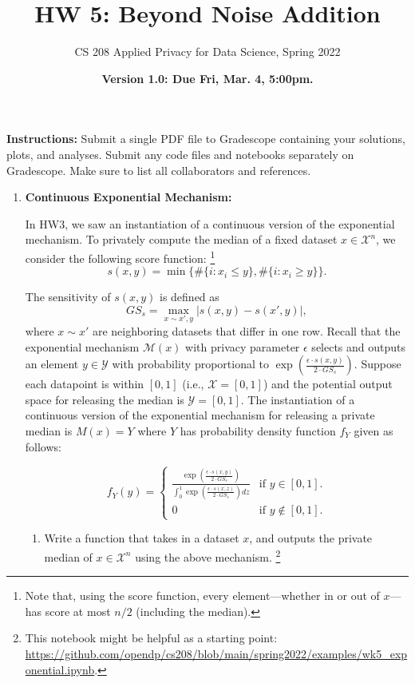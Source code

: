 \documentclass[11pt]{article}
\title{\vspace{-1.5cm} HW 5: Beyond Noise Addition
}
\author{CS 208 Applied Privacy for Data Science, Spring 2022}
\date{\textbf{Version 1.0: Due Fri, Mar. 4, 5:00pm.}}
\newcommand{\instructions}{\noindent \textbf{Instructions:} Submit a single PDF file to Gradescope containing your solutions, plots, and analyses. Submit any code files and notebooks separately on Gradescope. Make sure to list all collaborators and references.}
\newcommand{\calX}{\mathcal{X}}
\begin{document}
    \maketitle

    \instructions

    \begin{enumerate}[leftmargin=*]

        \item \textbf{Continuous Exponential Mechanism:}

        In HW3, we saw an instantiation of a continuous version
        of the exponential mechanism. To privately compute the median of a fixed dataset $x\in \mathcal{X}^n$, we consider the following score function:
        \footnote{Note that, using the score function,
            every element---whether in or out of $x$---has
            score at most $n/2$ (including the median).}
        $$s(x,y)=\min\{\#\{i: x_i\le y\},\#\{i: x_i\ge y\}\}.$$

        The sensitivity of $s(x,y)$ is defined as
        $$GS_s=\max_{x\sim x', y}|s(x,y)-s(x',y)|,$$
        where $x\sim x'$ are neighboring datasets that differ in
        one row.
        Recall that the exponential mechanism $\mathcal{M}(x)$ with privacy parameter $\epsilon$ selects and outputs an element $y\in \mathcal{Y}$ with probability proportional to $\exp\left(\frac{\epsilon\cdot s(x,y)}{2\cdot GS_s}\right)$. Suppose each datapoint is within $[0,1]$
        (i.e., $\mathcal{X}=[0,1]$) and
        the potential output space for releasing the median is $\mathcal{Y}=[0,1]$.
        The instantiation of a continuous version
        of the exponential mechanism for releasing a private median is
        $M(x) = Y$ where $Y$ has probability density function $f_Y$ given as follows:

        $$f_Y(y) = \begin{cases}
                       \frac{\exp\left(\frac{\epsilon\cdot s(x,y)}{2\cdot GS_s}\right)}{\int_0^1 \exp\left(\frac{\epsilon\cdot s(x,z)}{2\cdot GS_s}\right) dz} & \text{if } y\in [0,1].\\
                       0 & \text{if } y\notin [0,1].
        \end{cases}$$

        \begin{enumerate}
            \item Write a function that takes in a dataset $x$, and outputs the private median of $x\in\calX^n$ using the above mechanism.
            \footnote{This notebook might be helpful as a starting point: \url{https://github.com/opendp/cs208/blob/main/spring2022/examples/wk5_exponential.ipynb}.}


\end{enumerate}
\end{enumerate}
\end{document}
